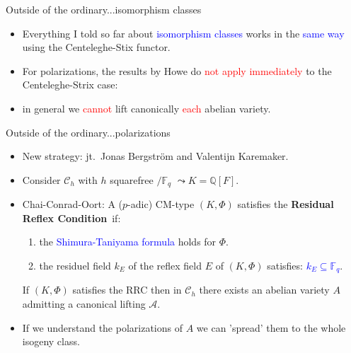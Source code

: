 \documentclass[usenames,dvipsnames]{beamer}
\def\Q{\mathbb{Q}}
\def\F{\mathbb{F}}
\newcommand{\cA}{{\mathcal A}}
\newcommand{\cC}{{\mathcal C}}
\newcommand{\vphi}{\varphi}
\newcommand{\set}[1]{\left\lbrace#1\right\rbrace }
\newcommand{\red}[1]{\textcolor{red}{#1}}
\newcommand{\blue}[1]{\textcolor{blue}{#1}}
\begin{document}
\begin{frame}{ Outside of the ordinary...isomorphism classes } 
	\begin{itemize}
		\item Everything I told so far about \blue{isomorphism classes} works in the \blue{same way} using the Centeleghe-Stix functor.
	\pause
	\pause
		\item For polarizations, the results by Howe do \red{not apply immediately} to the Centeleghe-Strix case:
	\pause
		\item in general we \red{cannot} lift canonically \red{each} abelian variety.
	\end{itemize}
\end{frame}

\begin{frame}{ Outside of the ordinary...polarizations } 
	\begin{itemize}
	\item New strategy: jt.~Jonas Bergstr\"om and Valentijn Karemaker.
\pause
	\item Consider $\cC_h$ with $h$ squarefree $/\F_q$ $\leadsto K=\Q[F]$. 
\pause 
	\item Chai-Conrad-Oort:
	A ($p$-adic) CM-type $(K,\Phi)$ satisfies the {\bf Residual Reflex Condition}~if:
	\begin{enumerate}[1.]
\pause 
	\item the \blue{Shimura-Taniyama formula} holds for $\Phi$.
\pause
	\item the residuel field $k_E$ of the reflex field $E$ of $(K,\Phi)$ satisfies: \blue{$k_E \subseteq \F_q$}.
	\end{enumerate}
\pause
	\begin{theorem}
	If $(K,\Phi)$ satisfies the RRC then in $\cC_h$ there exists an abelian variety $A$ admitting a canonical lifting $\cA$. 
	\end{theorem}
\pause
	\item If we understand the polarizations of $A$ we can 'spread' them to the whole isogeny class.
	\end{itemize}
\end{frame}
\end{document}
